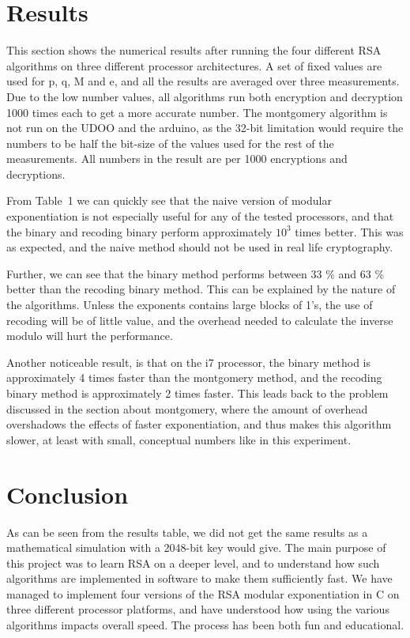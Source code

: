 \documentclass[twocolumn]{IEEEtran}
\begin{document}
\section{Results}
This section shows the numerical results after running the four different RSA algorithms on three different processor architectures. A set of fixed values are used for p, q, M and e, and all the results are averaged over three measurements. Due to the low number values, all algorithms run both encryption and decryption 1000 times each to get a more accurate number. The montgomery algorithm is not run on the UDOO and the arduino, as the 32-bit limitation would require the numbers to be half the bit-size of the values used for the rest of the measurements. All numbers in the result are per 1000 encryptions and decryptions.

From Table~1 we can quickly see that the naive version of modular exponentiation is not especially useful for any of the tested processors, and that the binary and recoding binary perform approximately $10^3$ times better. This was as expected, and the naive method should not be used in real life cryptography.

Further, we can see that the binary method performs between 33 \% and 63 \% better than the recoding binary method. This can be explained by the nature of the algorithms. Unless the exponents contains large blocks of 1’s, the use of recoding will be of little value, and the overhead needed to calculate the inverse modulo will hurt the performance.

Another noticeable result, is that on the i7 processor, the binary method is approximately 4 times faster than the montgomery method, and the recoding binary method is approximately 2 times faster. This leads back to the problem discussed in the section about montgomery, where the amount of overhead overshadows the effects of faster exponentiation, and thus makes this algorithm slower, at least with small, conceptual numbers like in this experiment.

\section{Conclusion}
As can be seen from the results table, we did not get the same results as a mathematical simulation with a 2048-bit key would give. The main purpose of this project was to learn RSA on a deeper level, and to understand how such algorithms are implemented in software to make them sufficiently fast.  We have managed to implement four versions of the RSA modular exponentiation in C on three different processor platforms, and have understood how using the various algorithms impacts overall speed. The process has been both fun and educational.



\end{document}

